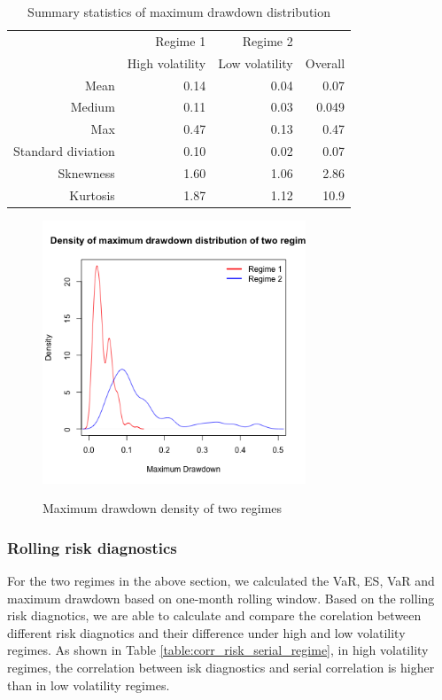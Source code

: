 \documentclass[12pt]{article}
\begin{document}
\begin{table}[h]
\caption{Summary statistics of maximum drawdown distribution} 
\centering 
\begin{tabular}{| r | r | r | r |} 
 \hline
& Regime 1 & Regime 2 & \\
& High volatility & Low volatility & Overall \\
 \hline 
Mean & 0.14 & 0.04 & 0.07\\
Medium  & 0.11 & 0.03 & 0.049 \\
Max  & 0.47 & 0.13 & 0.47\\
Standard diviation & 0.10 & 0.02 & 0.07\\
Sknewness & 1.60 & 1.06 & 2.86\\
Kurtosis  & 1.87 & 1.12 & 10.9\\
 \hline
\end{tabular}
\label{table:SummatyMDDRegimeRMZ}
\end{table}


\begin{figure}[h]
\caption{Maximum drawdown density of two regimes} 
\centering 
\includegraphics[width=0.7\textwidth]{../results/regime/RMZ_mon1_mdd}
\label{fig: RMZregime_mdd}
\end{figure}

\subsubsection{Rolling risk diagnostics}

For the two regimes in the above section, we calculated the VaR, ES, VaR and maximum drawdown based on one-month rolling window. Based on the rolling risk diagnotics, we are able to calculate and compare the corelation between different risk diagnotics and their difference under high and low volatility regimes. As shown in Table \ref{table:corr_risk_serial_regime}, in high volatility regimes, the correlation between isk diagnostics and serial correlation is higher than in low volatility regimes.
\end{document}
